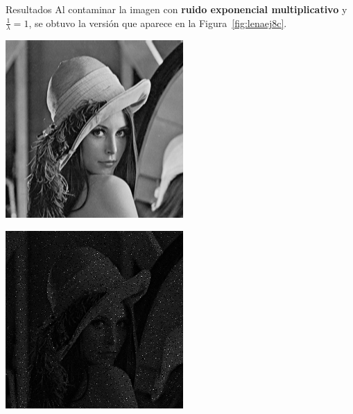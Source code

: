 \documentclass{beamer}
\begin{document}
\begin{frame}[fragile]{Resultados}
	\justifying
	Al contaminar la imagen con \textcolor{unahurverde}{\textbf{ruido exponencial multiplicativo}} y $\frac{1}{\lambda}=1$, 
	se obtuvo la versión que aparece en la Figura~\ref{fig:lenaej8c}.
	
	\vspace{0.5cm}
	\centering
	\begin{minipage}{0.45\linewidth}
		\centering
		\includegraphics[width=\linewidth]{../results/lena_original}
		\label{fig:lenaoriginal8c}
	\end{minipage}\hfill
	\begin{minipage}{0.45\linewidth}
		\centering
		\includegraphics[width=\linewidth]{../results/lena_ej8c}

\end{minipage}
\end{frame}
\end{document}
